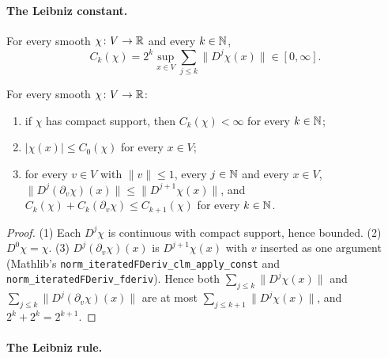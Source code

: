 \paragraph{The Leibniz constant.}

\begin{definition}
\label{def:leibniz-constant}
\leanok
For every smooth $\chi \colon V \to \mathbb{R}$ and every $k \in \mathbb{N}$,
\[
  C_k(\chi) = 2^k \sup_{x \in V} \sum_{j \leq k} \|D^j \chi(x)\| \in [0, \infty] .
\]
\end{definition}

\begin{lemma}
\label{lem:leibniz-constant}
\leanok
{}
For every smooth $\chi \colon V \to \mathbb{R}$:
\begin{enumerate}
  \item if $\chi$ has compact support, then $C_k(\chi) < \infty$ for every $k \in \mathbb{N}$;
  \item $|\chi(x)| \leq C_0(\chi)$ for every $x \in V$;
  \item for every $v \in V$ with $\|v\| \leq 1$, every $j \in \mathbb{N}$ and every $x \in V$,
    $\|D^j (\partial_v \chi)(x)\| \leq \|D^{j+1} \chi(x)\|$, and
    $C_k(\chi) + C_k(\partial_v \chi) \leq C_{k+1}(\chi)$ for every $k \in \mathbb{N}$.
\end{enumerate}
\end{lemma}

\begin{proof}
\leanok
(1) Each $D^j \chi$ is continuous with compact support, hence bounded. (2) $D^0 \chi = \chi$.
(3) $D^j (\partial_v \chi)(x)$ is $D^{j+1} \chi(x)$ with $v$ inserted as one argument (Mathlib's
\texttt{norm\_\allowbreak iteratedFDeriv\_\allowbreak clm\_\allowbreak apply\_\allowbreak const}
and \texttt{norm\_\allowbreak iteratedFDeriv\_\allowbreak fderiv}). Hence both
$\sum_{j \leq k} \|D^j \chi(x)\|$ and $\sum_{j \leq k} \|D^j (\partial_v \chi)(x)\|$ are at most
$\sum_{j \leq k+1} \|D^j \chi(x)\|$, and $2^k + 2^k = 2^{k+1}$.
\end{proof}

\paragraph{The Leibniz rule.}

